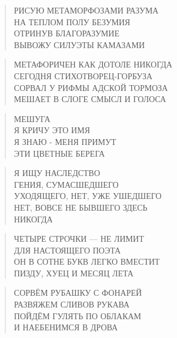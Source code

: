 \poemtitle{***}
\begin{verse}
РИСУЮ МЕТАМОРФОЗАМИ РАЗУМА\\
НА ТЕПЛОМ ПОЛУ БЕЗУМИЯ\\
ОТРИНУВ БЛАГОРАЗУМИЕ\\
ВЫВОЖУ СИЛУЭТЫ КАМАЗАМИ
\end{verse}

\poemtitle{***}
\begin{verse}
МЕТАФОРИЧЕН КАК ДОТОЛЕ НИКОГДА\\
СЕГОДНЯ СТИХОТВОРЕЦ-ГОРБУЗА\\
СОРВАЛ У РИФМЫ АДСКОЙ ТОРМОЗА\\
МЕШАЕТ В СЛОГЕ СМЫСЛ И ГОЛОСА
\end{verse}

\poemtitle{***}
\begin{verse}
МЕШУГА\\
Я КРИЧУ ЭТО ИМЯ\\
Я ЗНАЮ - МЕНЯ ПРИМУТ\\
ЭТИ ЦВЕТНЫЕ БЕРЕГА
\end{verse}

\poemtitle{***}
\begin{verse}
Я ИЩУ НАСЛЕДСТВО\\
ГЕНИЯ, СУМАСШЕДШЕГО\\
УХОДЯЩЕГО, НЕТ, УЖЕ УШЕДШЕГО\\
НЕТ, ВОВСЕ НЕ БЫВШЕГО ЗДЕСЬ\\
НИКОГДА
\end{verse}

\poemtitle{***}
\begin{verse}
ЧЕТЫРЕ СТРОЧКИ — НЕ ЛИМИТ\\
ДЛЯ НАСТОЯЩЕГО ПОЭТА\\
ОН В СОТНЕ БУКВ ЛЕГКО ВМЕСТИТ\\
ПИЗДУ, ХУЕЦ И МЕСЯЦ ЛЕТА
\end{verse}

\poemtitle{***}
\begin{verse}
СОРВЁМ РУБАШКУ С ФОНАРЕЙ\\
РАЗВЯЖЕМ СЛИВОВ РУКАВА\\
ПОЙДЁМ ГУЛЯТЬ ПО ОБЛАКАМ\\
И НАЕБЕНИМСЯ В ДРОВА
\end{verse}

